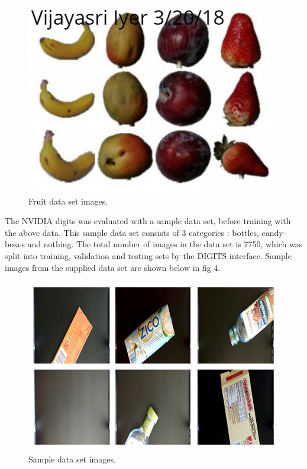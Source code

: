 \documentclass[10pt,journal,compsoc]{IEEEtran}
\begin{document}
\begin{figure}[thpb]
      \centering
      \includegraphics[width=\linewidth]{mydata.png}
      \caption{Fruit data set images.}
      \label{fig:robot1}
\end{figure}

The NVIDIA digits was evaluated with a sample data set, before training with the above data. This sample data set consists of 3 categories : bottles, candy-boxes and nothing. The total number of images in the data set is 7750, which was split into training, validation and testing sets by the DIGITS interface. Sample images from the supplied data set are shown below in fig 4.

\begin{figure}[tbhp]
      \centering
      \includegraphics[width=\linewidth]{data.jpg}
      \caption{Sample data set images.}
      \label{fig:robot1}
\end{figure}
\end{document}
